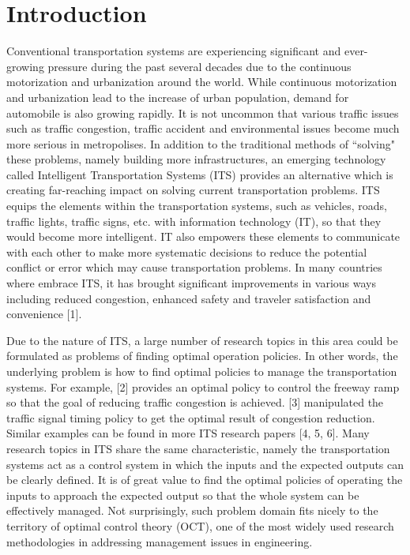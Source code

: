 \documentclass[12pt,onecolumn,twoside]{JCTA}
\theoremstyle{mystyle}
\begin{document}
\section{Introduction}
Conventional transportation systems are experiencing significant and ever-growing pressure during the past several decades due to the continuous motorization and urbanization around the world. While continuous motorization and urbanization lead to the increase of urban population, demand for automobile is also growing rapidly. It is not uncommon that various traffic issues such as traffic congestion, traffic accident and environmental issues become much more serious in metropolises. In addition to the traditional methods of ``solving" these problems, namely building more infrastructures, an emerging technology called Intelligent Transportation Systems (ITS) provides an alternative which is creating far-reaching impact on solving current transportation problems. ITS equips the elements within the transportation systems, such as vehicles, roads, traffic lights, traffic signs, etc. with information technology (IT), so that they would become more intelligent. IT also empowers these elements to communicate with each other to make more systematic decisions to reduce the potential conflict or error which may cause transportation problems. In many countries where embrace ITS, it has brought significant improvements in various ways including reduced congestion, enhanced safety and traveler satisfaction and convenience [1].

Due to the nature of ITS, a large number of research topics in this area could be formulated as problems of finding optimal operation policies. In other words, the underlying problem is how to find optimal policies to manage the transportation systems. For example, [2] provides an optimal policy to control the freeway ramp so that the goal of reducing traffic congestion is achieved. [3] manipulated the traffic signal timing policy to get the optimal result of congestion reduction. Similar examples can be found in more ITS research papers [4, 5, 6]. Many research topics in ITS share the same characteristic, namely the transportation systems act as a control system in which the inputs and the expected outputs can be clearly defined. It is of great value to find the optimal policies of operating the inputs to approach the expected output so that the whole system can be effectively managed. Not surprisingly, such problem domain fits nicely to the territory of optimal control theory (OCT), one of the most widely used research methodologies in addressing management issues in engineering.
\end{document}
